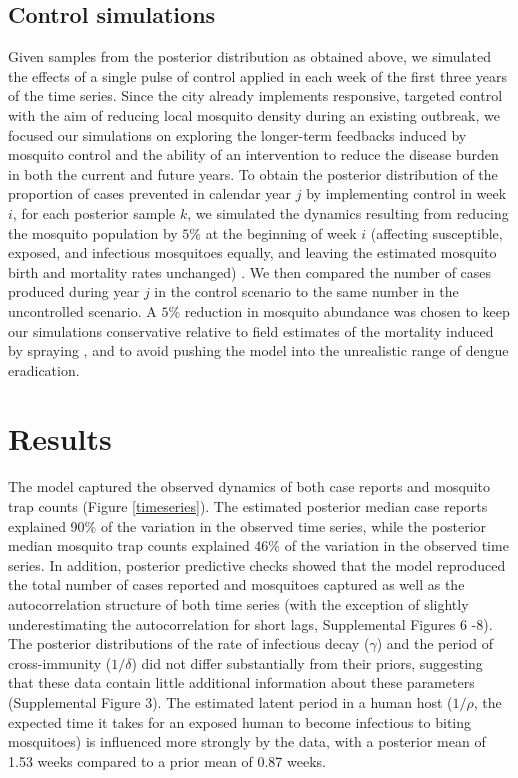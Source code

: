 \documentclass[10pt,letterpaper]{article}
\begin{document}
\subsection*{Control simulations}

Given samples from the posterior distribution as obtained above, we simulated the effects of a single pulse of control applied in each week of the first three years of the time series.
Since the city already implements responsive, targeted control with the aim of reducing local mosquito density during an existing outbreak, we focused our simulations on exploring the longer-term feedbacks induced by mosquito control and the ability of an intervention to reduce the disease burden in both the current and future years.
To obtain the posterior distribution of the proportion of cases prevented in calendar year $j$ by implementing control in week $i$, for each posterior sample $k$, we simulated the dynamics resulting from reducing the mosquito population by $5\%$ at the beginning of week $i$ (affecting susceptible, exposed, and infectious mosquitoes equally, and leaving the estimated mosquito birth and mortality rates unchanged) .
We then compared the number of cases produced during year $j$ in the control scenario to the same number in the uncontrolled scenario.
A $5\%$ reduction in mosquito abundance was chosen to keep our simulations conservative relative to field estimates of the mortality induced by spraying \cite{Esu2010}, and to avoid pushing the model into the unrealistic range of dengue eradication.

\section*{Results}

The model captured the observed dynamics of both case reports and mosquito trap counts (Figure \ref{timeseries}).
The estimated posterior median case reports explained 90\% of the variation in the observed time series, while the posterior median mosquito trap counts explained 46\% of the variation in the observed time series. 
In addition, posterior predictive checks showed that the model reproduced the total number of cases reported and mosquitoes captured as well as the autocorrelation structure of both time series (with the exception of slightly underestimating the autocorrelation for short lags, Supplemental Figures 6 -8).
The posterior distributions of the rate of infectious decay ($\gamma$) and the period of cross-immunity ($1/\delta$) did not differ substantially from their priors, suggesting that these data contain little additional information about these parameters (Supplemental Figure 3).
The estimated latent period in a human host ($1/\rho$, the expected time it takes for an exposed human to become infectious to biting mosquitoes) is influenced more strongly by the data, with a posterior mean of 1.53 weeks compared to a prior mean of 0.87 weeks.
\end{document}
